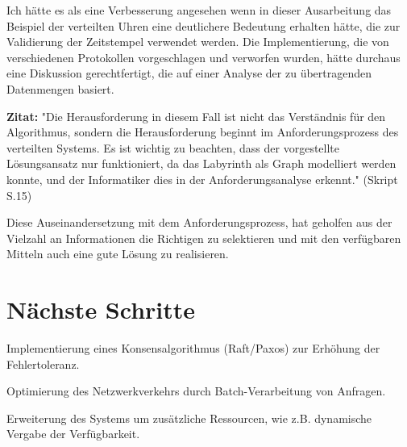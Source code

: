 \documentclass{article}
\begin{document}
Ich hätte es als eine Verbesserung angesehen wenn in dieser Ausarbeitung das Beispiel der verteilten Uhren eine deutlichere Bedeutung erhalten hätte, die zur Validierung der Zeitstempel verwendet werden. Die Implementierung, die von verschiedenen Protokollen vorgeschlagen und verworfen wurden, hätte durchaus eine Diskussion gerechtfertigt, die auf einer Analyse der zu übertragenden Datenmengen basiert.

\textbf{Zitat:} "Die Herausforderung in diesem Fall ist nicht das Verständnis für den Algorithmus, sondern
die Herausforderung beginnt im Anforderungsprozess des verteilten Systems. Es ist wichtig zu beachten, dass der vorgestellte Lösungsansatz nur funktioniert, da das Labyrinth als Graph modelliert werden konnte, und der Informatiker dies in der Anforderungsanalyse erkennt." (Skript S.15)

Diese Auseinandersetzung mit dem Anforderungsprozess, hat geholfen aus der Vielzahl an Informationen die Richtigen zu selektieren und mit den verfügbaren Mitteln auch eine gute Lösung zu realisieren.


\section{Nächste Schritte}

Implementierung eines Konsensalgorithmus (Raft/Paxos) zur Erhöhung der Fehlertoleranz.

Optimierung des Netzwerkverkehrs durch Batch-Verarbeitung von Anfragen.

Erweiterung des Systems um zusätzliche Ressourcen, wie z.B. dynamische Vergabe der Verfügbarkeit.
\end{document}
